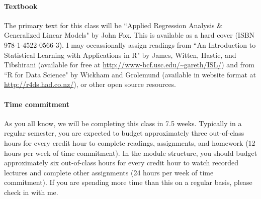 \documentclass[11pt]{article}
\begin{document}
\paragraph{Textbook}

The primary text for this class will be ``Applied Regression Analysis \& Generalized Linear Models" by John Fox. This is available as a hard cover (ISBN 978-1-4522-0566-3). I may occassionally assign readings from ``An Introduction to Statistical Learning with Applications in R" by James, Witten, Hastie, and Tibshirani (available for free at \url{http://www-bcf.usc.edu/~gareth/ISL/}) and from ``R for Data Science" by Wickham and Grolemund (available in website format at \url{http://r4ds.had.co.nz/}), or other open source resources.


%

\paragraph{Time commitment}

As you all know, we will be completing this class in 7.5 weeks. Typically in a regular semester, you are expected to budget approximately three out-of-class hours for every credit hour to complete readings, assignments, and homework (12 hours per week of time commitment). In the module structure, you should budget approximately six out-of-class hours for every credit hour to watch recorded lectures and complete other assignments (24 hours per week of time commitment). If you are spending more time than this on a regular basis, please check in with me.
\end{document}
